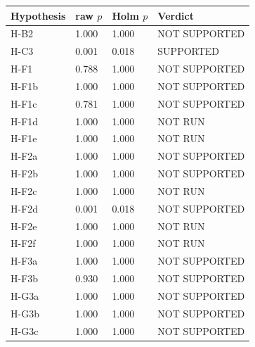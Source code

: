 \begin{tabular}{llll}
\hline
Hypothesis & raw $p$ & Holm $p$ & Verdict \\
\hline
H-B2 & 1.000 & 1.000 & NOT SUPPORTED \\
H-C3 & 0.001 & 0.018 & SUPPORTED \\
H-F1 & 0.788 & 1.000 & NOT SUPPORTED \\
H-F1b & 1.000 & 1.000 & NOT SUPPORTED \\
H-F1c & 0.781 & 1.000 & NOT SUPPORTED \\
H-F1d & 1.000 & 1.000 & NOT RUN \\
H-F1e & 1.000 & 1.000 & NOT RUN \\
H-F2a & 1.000 & 1.000 & NOT SUPPORTED \\
H-F2b & 1.000 & 1.000 & NOT SUPPORTED \\
H-F2c & 1.000 & 1.000 & NOT RUN \\
H-F2d & 0.001 & 0.018 & NOT SUPPORTED \\
H-F2e & 1.000 & 1.000 & NOT RUN \\
H-F2f & 1.000 & 1.000 & NOT RUN \\
H-F3a & 1.000 & 1.000 & NOT SUPPORTED \\
H-F3b & 0.930 & 1.000 & NOT SUPPORTED \\
H-G3a & 1.000 & 1.000 & NOT SUPPORTED \\
H-G3b & 1.000 & 1.000 & NOT SUPPORTED \\
H-G3c & 1.000 & 1.000 & NOT SUPPORTED \\
\hline
\end{tabular}
